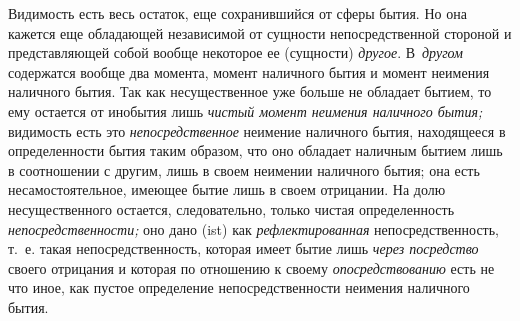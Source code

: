 Видимость есть весь остаток, еще сохранившийся от сферы бытия. Но она
кажется еще обладающей независимой от сущности непосредственной стороной и
представляющей собой вообще некоторое ее (сущности)
{\em другое}. В~{\em другом}
содержатся вообще два момента, момент наличного бытия и момент неимения
наличного бытия. Так как несущественное уже больше не обладает бытием, то
ему остается от инобытия лишь {\em чистый момент
неимения наличного бытия;} видимость есть это
{\em непосредственное} неимение наличного бытия,
находящееся в определенности бытия таким образом, что оно обладает наличным
бытием лишь в соотношении с другим, лишь в своем неимении наличного бытия;
она есть несамостоятельное, имеющее бытие лишь в своем отрицании. На долю
несущественного остается, следовательно, только чистая определенность
{\em непосредственности;} оно дано (ist) как
{\em рефлектированная} непосредственность, т.~е. такая
непосредственность, которая имеет бытие лишь {\em через
посредство} своего отрицания и которая по отношению к своему
{\em опосредствованию} есть не что иное, как пустое
определение непосредственности неимения наличного бытия.

